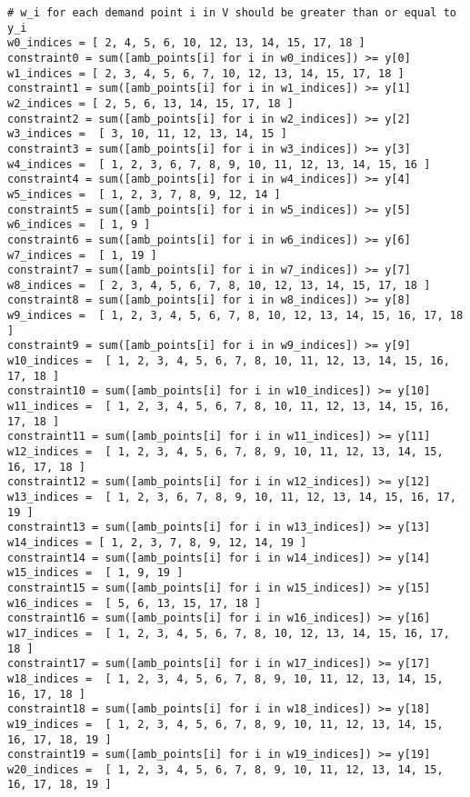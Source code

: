 \documentclass{article}
\newenvironment{code}{\captionsetup{type=listing}}{}
\begin{document}
\begin{code}
\begin{verbatim}
# w_i for each demand point i in V should be greater than or equal to y_i
w0_indices = [ 2, 4, 5, 6, 10, 12, 13, 14, 15, 17, 18 ]  
constraint0 = sum([amb_points[i] for i in w0_indices]) >= y[0]
w1_indices = [ 2, 3, 4, 5, 6, 7, 10, 12, 13, 14, 15, 17, 18 ]  
constraint1 = sum([amb_points[i] for i in w1_indices]) >= y[1]
w2_indices = [ 2, 5, 6, 13, 14, 15, 17, 18 ]  
constraint2 = sum([amb_points[i] for i in w2_indices]) >= y[2]
w3_indices =  [ 3, 10, 11, 12, 13, 14, 15 ]  
constraint3 = sum([amb_points[i] for i in w3_indices]) >= y[3]
w4_indices =  [ 1, 2, 3, 6, 7, 8, 9, 10, 11, 12, 13, 14, 15, 16 ]  
constraint4 = sum([amb_points[i] for i in w4_indices]) >= y[4]
w5_indices =  [ 1, 2, 3, 7, 8, 9, 12, 14 ]  
constraint5 = sum([amb_points[i] for i in w5_indices]) >= y[5]
w6_indices =  [ 1, 9 ]  
constraint6 = sum([amb_points[i] for i in w6_indices]) >= y[6]
w7_indices =  [ 1, 19 ]  
constraint7 = sum([amb_points[i] for i in w7_indices]) >= y[7]
w8_indices =  [ 2, 3, 4, 5, 6, 7, 8, 10, 12, 13, 14, 15, 17, 18 ]  
constraint8 = sum([amb_points[i] for i in w8_indices]) >= y[8]
w9_indices =  [ 1, 2, 3, 4, 5, 6, 7, 8, 10, 12, 13, 14, 15, 16, 17, 18 ]  
constraint9 = sum([amb_points[i] for i in w9_indices]) >= y[9]
w10_indices =  [ 1, 2, 3, 4, 5, 6, 7, 8, 10, 11, 12, 13, 14, 15, 16, 17, 18 ]  
constraint10 = sum([amb_points[i] for i in w10_indices]) >= y[10]
w11_indices =  [ 1, 2, 3, 4, 5, 6, 7, 8, 10, 11, 12, 13, 14, 15, 16, 17, 18 ]  
constraint11 = sum([amb_points[i] for i in w11_indices]) >= y[11]
w12_indices =  [ 1, 2, 3, 4, 5, 6, 7, 8, 9, 10, 11, 12, 13, 14, 15, 16, 17, 18 ]
constraint12 = sum([amb_points[i] for i in w12_indices]) >= y[12]
w13_indices =  [ 1, 2, 3, 6, 7, 8, 9, 10, 11, 12, 13, 14, 15, 16, 17, 19 ]  
constraint13 = sum([amb_points[i] for i in w13_indices]) >= y[13]
w14_indices = [ 1, 2, 3, 7, 8, 9, 12, 14, 19 ]
constraint14 = sum([amb_points[i] for i in w14_indices]) >= y[14]
w15_indices =  [ 1, 9, 19 ]  
constraint15 = sum([amb_points[i] for i in w15_indices]) >= y[15]
w16_indices =  [ 5, 6, 13, 15, 17, 18 ]  
constraint16 = sum([amb_points[i] for i in w16_indices]) >= y[16]
w17_indices =  [ 1, 2, 3, 4, 5, 6, 7, 8, 10, 12, 13, 14, 15, 16, 17, 18 ]  
constraint17 = sum([amb_points[i] for i in w17_indices]) >= y[17]
w18_indices =  [ 1, 2, 3, 4, 5, 6, 7, 8, 9, 10, 11, 12, 13, 14, 15, 16, 17, 18 ]
constraint18 = sum([amb_points[i] for i in w18_indices]) >= y[18]
w19_indices =  [ 1, 2, 3, 4, 5, 6, 7, 8, 9, 10, 11, 12, 13, 14, 15, 16, 17, 18, 19 ]  
constraint19 = sum([amb_points[i] for i in w19_indices]) >= y[19]
w20_indices =  [ 1, 2, 3, 4, 5, 6, 7, 8, 9, 10, 11, 12, 13, 14, 15, 16, 17, 18, 19 ]  

\end{verbatim}
\end{code}
\end{document}
